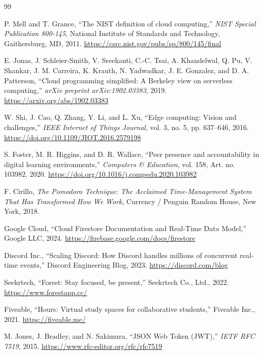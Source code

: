 \documentclass[12pt,a4paper,openany]{report}
\begin{document}
\clearpage
\begin{thebibliography}{99}
 
P. Mell and T. Grance, ``The NIST definition of cloud computing,'' \textit{NIST Special Publication 800-145}, National Institute of Standards and Technology, Gaithersburg, MD, 2011. \url{https://csrc.nist.gov/pubs/sp/800/145/final}

E. Jonas, J. Schleier-Smith, V. Sreekanti, C.-C. Tsai, A. Khandelwal, Q. Pu, V. Shankar, J. M. Carreira, K. Krauth, N. Yadwadkar, J. E. Gonzalez, and D. A. Patterson, ``Cloud programming simplified: A Berkeley view on serverless computing,'' \textit{arXiv preprint arXiv:1902.03383}, 2019. \url{https://arxiv.org/abs/1902.03383}

W. Shi, J. Cao, Q. Zhang, Y. Li, and L. Xu, ``Edge computing: Vision and challenges,'' \textit{IEEE Internet of Things Journal}, vol. 3, no. 5, pp. 637--646, 2016. \url{https://doi.org/10.1109/JIOT.2016.2579198}

S. Foster, M. R. Higgins, and D. R. Wallace, ``Peer presence and accountability in digital learning environments,'' \textit{Computers \& Education}, vol. 158, Art. no. 103982, 2020. \url{https://doi.org/10.1016/j.compedu.2020.103982}

F. Cirillo, \textit{The Pomodoro Technique: The Acclaimed Time-Management System That Has Transformed How We Work}, Currency / Penguin Random House, New York, 2018.

Google Cloud, ``Cloud Firestore Documentation and Real-Time Data Model,'' Google LLC, 2024. \url{https://firebase.google.com/docs/firestore}

Discord Inc., ``Scaling Discord: How Discord handles millions of concurrent real-time events,'' Discord Engineering Blog, 2023. \url{https://discord.com/blog}

Seekrtech, ``Forest: Stay focused, be present,'' Seekrtech Co., Ltd., 2022. \url{https://www.forestapp.cc/}

Fiveable, ``Hours: Virtual study spaces for collaborative students,'' Fiveable Inc., 2021. \url{https://fiveable.me/}

M. Jones, J. Bradley, and N. Sakimura, ``JSON Web Token (JWT),'' \textit{IETF RFC 7519}, 2015. \url{https://www.rfc-editor.org/rfc/rfc7519}


\end{thebibliography}
\end{document}
